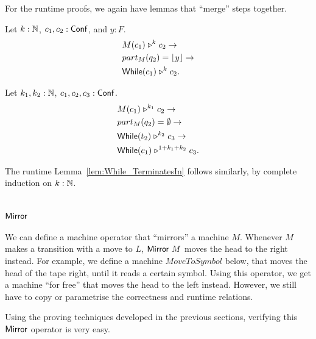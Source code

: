 For the runtime proofs, we again have lemmas that ``merge'' steps together.

\begin{lemma}
  Let $k : \mathbb{N}$, $c_1, c_2 : \mathsf{Conf}$, and $y:F$.
  \begin{alignat*}{1}
    & M(c_1) \mathrel{\triangleright}^k c_2 \rightarrow \\
    & part_M(q_2) = \left\lfloor {y} \right\rfloor \rightarrow \\
    & \mathsf{While}(c_1) \mathrel{\triangleright}^k c_2.
  \end{alignat*}
\end{lemma}
\begin{lemma}
  Let $k_1, k_2 : \mathbb{N}$, $c_1, c_2, c_3 : \mathsf{Conf}$.
  \begin{alignat*}{1}
    & M(c_1) \mathrel{\triangleright}^{k_1} c_2 \rightarrow \\
    & part_M(q_2) = \emptyset \rightarrow \\
    & \mathsf{While}(t_2) \mathrel{\triangleright}^{k_2} c_3 \rightarrow \\
    & \mathsf{While}(c_1) \mathrel{\triangleright}^{1+k_1+k_2} c_3.
  \end{alignat*}
\end{lemma}

The runtime Lemma~\ref{lem:While_TerminatesIn} follows similarly, by complete induction on $k:\mathbb{N}$.



\section{$\mathsf{Mirror}$}
\label{sec:mirror}

We can define a machine operator that ``mirrors'' a machine $M$.  Whenever $M$ makes a transition with a move to $L$, $\mathsf{Mirror}~M$ moves the head
to the right instead.  For example, we define a machine $MoveToSymbol$ below, that moves the head of the tape right, until it reads a certain symbol.
Using this operator, we get a machine ``for free'' that moves the head to the left instead.  However, we still have to copy or parametrise the
correctness and runtime relations.

Using the proving techniques developed in the previous sections, verifying this $\mathsf{Mirror}$ operator is very easy.

